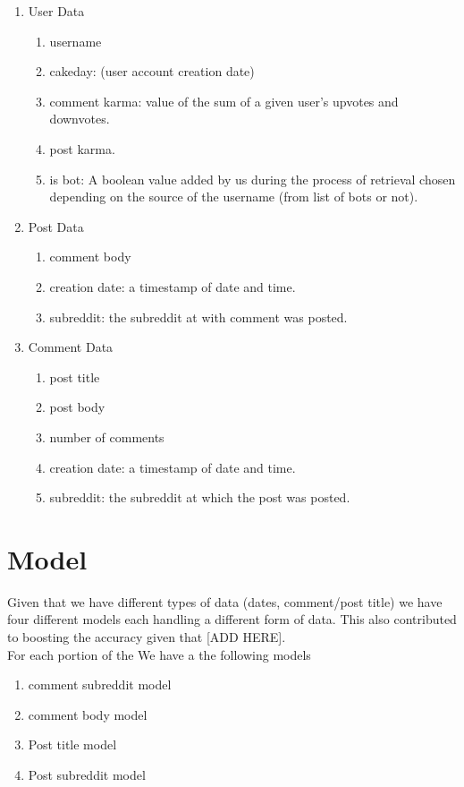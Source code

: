 \documentclass{article}
\begin{document}
    \begin{enumerate}
        \item User Data
            \begin{enumerate}
                \item username
                \item cakeday: (user account creation date)
                \item comment karma: value of the sum of a given user's upvotes and downvotes.
                \item post karma.
                \item is bot: A boolean value added by us during the process of retrieval chosen depending on the source of the username (from list of bots or not).
            \end{enumerate}
        \item Post Data
            \begin{enumerate}
                \item comment body
                \item creation date: a timestamp of date and time.
                \item subreddit: the subreddit at with comment was posted.
            \end{enumerate}
        \item Comment Data
            \begin{enumerate}
                \item post title
                \item post body
                \item number of comments
                \item creation date: a timestamp of date and time.
                \item subreddit: the subreddit at which the post was posted.
            \end{enumerate}
    \end{enumerate}

    
\section{Model}
    Given that we have different types of data (dates, comment/post title) we have four different models each handling a different form of data. This also contributed to boosting the accuracy given that [ADD HERE].\\
    For each portion of the
    We have a the following models
    \begin{enumerate}
        \item comment subreddit model
        \item comment body model
        \item Post title model
        \item Post subreddit model
    \end{enumerate}
    
\end{document}
